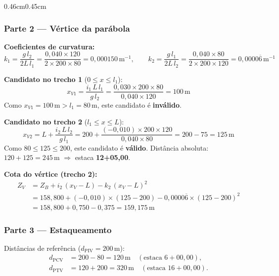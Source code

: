 \documentclass[12pt,letterpaper]{article}
\newenvironment{corpo}{\begin{adjustwidth}{0.46cm}{0.45cm}\justifying}{\end{adjustwidth}}
\begin{document}
\begin{corpo}
\subsubsection*{Parte 2 — Vértice da parábola}

\textbf{Coeficientes de curvatura:}
\[
  k_1 = \frac{g\,l_2}{2L\,l_1} = \frac{0{,}040 \times 120}{2 \times 200 \times 80} = 0{,}000150\,\text{m}^{-1}, \qquad
  k_2 = \frac{g\,l_1}{2L\,l_2} = \frac{0{,}040 \times 80}{2 \times 200 \times 120} = 0{,}0000\overline{6}\,\text{m}^{-1}
\]

\textbf{Candidato no trecho 1} ($0 \le x \le l_1$):
\[
  x_{V1} = \frac{i_1\,L\,l_1}{g\,l_2} = \frac{0{,}030 \times 200 \times 80}{0{,}040 \times 120} = 100\,\text{m}
\]
Como $x_{V1} = 100\,\text{m} > l_1 = 80\,\text{m}$, este candidato é \textbf{inválido}.

\textbf{Candidato no trecho 2} ($l_1 \le x \le L$):
\[
  x_{V2} = L + \frac{i_2\,L\,l_2}{g\,l_1} = 200 + \frac{(-0{,}010) \times 200 \times 120}{0{,}040 \times 80} = 200 - 75 = 125\,\text{m}
\]
Como $80 \le 125 \le 200$, este candidato é \textbf{válido}. Distância absoluta: $120 + 125 = 245\,\text{m}$ $\Rightarrow$ estaca \textbf{12+05,00}.

\textbf{Cota do vértice (trecho 2):}
\begin{align*}
  Z_V &= Z_B + i_2\,(x_V - L) - k_2\,(x_V - L)^2\\
      &= 158{,}800 + (-0{,}010)\times(125 - 200) - 0{,}0000\overline{6}\times(125-200)^2\\
      &= 158{,}800 + 0{,}750 - 0{,}375 = 159{,}175\,\text{m}
\end{align*}

\subsubsection*{Parte 3 — Estaqueamento}

Distâncias de referência ($d_{\mathrm{PIV}} = 200\,\text{m}$):
\begin{align*}
  d_{\mathrm{PCV}} &= 200 - 80 = 120\,\text{m} \quad (\text{estaca }6{+}00{,}00),\\
  d_{\mathrm{PTV}} &= 120 + 200 = 320\,\text{m} \quad (\text{estaca }16{+}00{,}00).
\end{align*}


\end{corpo}
\end{document}
